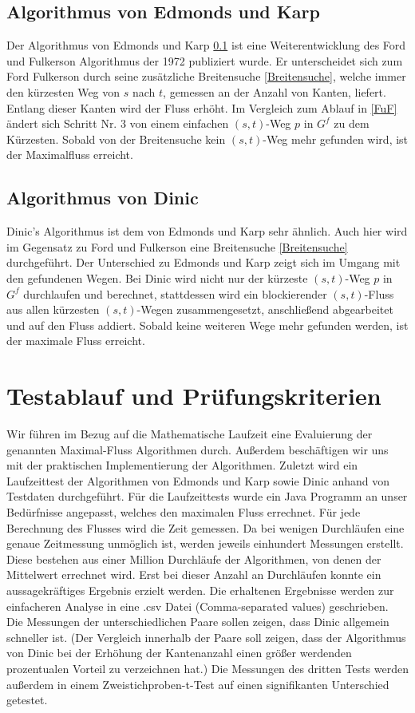 \documentclass[a4paper]{llncs}
\begin{document}
\subsection{Algorithmus von Edmonds und Karp}
\label{EuK}
Der Algorithmus von Edmonds und Karp \ref{EuK} ist eine Weiterentwicklung des Ford und Fulkerson Algorithmus der 1972 publiziert wurde.
Er unterscheidet sich zum Ford Fulkerson durch seine zusätzliche Breitensuche \ref{Breitensuche},
welche immer den kürzesten Weg von $s$ nach $t$, gemessen an der Anzahl von Kanten, liefert. 
Entlang dieser Kanten wird der Fluss erhöht.
Im Vergleich zum Ablauf in \ref{FuF} ändert sich Schritt Nr. 3 von einem einfachen $(s, t)$-Weg $p$ in $G^{f}$ zu dem Kürzesten.
Sobald von der Breitensuche kein $(s,t)$-Weg mehr gefunden wird, ist der Maximalfluss erreicht.

\subsection{Algorithmus von Dinic}
\label{Dinic}
Dinic's Algorithmus ist dem von Edmonds und Karp sehr ähnlich. Auch hier wird im Gegensatz zu Ford und Fulkerson eine Breitensuche \ref{Breitensuche} durchgeführt. Der Unterschied zu Edmonds und Karp zeigt sich im Umgang mit den gefundenen Wegen. Bei Dinic wird nicht nur der kürzeste $(s, t)$-Weg $p$ in $G^{f}$ durchlaufen und berechnet, stattdessen wird ein blockierender $(s, t)$-Fluss aus allen kürzesten $(s, t)$-Wegen zusammengesetzt, anschließend abgearbeitet und auf den Fluss addiert. Sobald keine weiteren Wege mehr gefunden werden, ist der maximale Fluss erreicht.

\section{Testablauf und Prüfungskriterien}
\label{Inhalt}
Wir führen im Bezug auf die Mathematische Laufzeit eine Evaluierung der genannten Maximal-Fluss Algorithmen durch. Außerdem beschäftigen wir uns mit der praktischen Implementierung der Algorithmen. Zuletzt wird ein Laufzeit\-test der Algorithmen von Edmonds und Karp sowie Dinic anhand von Testdaten durchgeführt.
Für die Laufzeittests wurde ein Java Programm an unser Bedürfnisse angepasst, welches den maximalen Fluss errechnet. 
Für jede Berechnung des Flusses wird die Zeit gemessen. Da bei wenigen Durchläufen eine genaue Zeitmessung unmöglich ist, werden jeweils einhundert Messungen erstellt. Diese bestehen aus einer Million Durchläufe der Algorithmen, von denen der Mittelwert errechnet wird.
Erst bei dieser Anzahl an Durchläufen konnte ein aussagekräftiges Ergebnis erzielt werden.
Die erhaltenen Ergebnisse werden zur einfacheren Analyse in eine .csv Datei (Comma-separated values) geschrieben.
Die Messungen der unterschiedlichen Paare sollen zeigen, dass Dinic allgemein schneller ist.
(Der Vergleich innerhalb der Paare soll zeigen, dass der Algorithmus von Dinic bei der Erhöhung der Kantenanzahl einen größer werdenden prozentualen Vorteil zu verzeichnen hat.)
Die Messungen des dritten Tests werden außerdem in einem Zweistichproben-t-Test auf einen signifikanten Unterschied getestet. 
\end{document}
